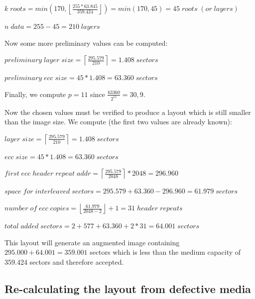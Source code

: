 \smallskip

$k\; roots = min\left(170, \left\lfloor\frac{255* 63.845}{359.424}\right\rfloor\right) = min(170, 45) = 45\; roots\; (or\; layers)$

\smallskip

$n\; data = 255 - 45 = 210\; layers$

\bigskip

Now some more preliminary values can be computed:

\smallskip

$preliminary\; layer\; size = \left\lceil\frac{295.579}{210}\right\rceil = 1.408\; sectors$

\smallskip

$preliminary\; ecc\; size = 45 * 1.408 = 63.360\; sectors$

\bigskip

Finally, we compute $p = 11$ since $\frac{63360}{2^{11}} = 30,9$.

\bigskip

Now the chosen values must be verified to produce a layout which is
still smaller than the image size. We compute (the first two values are already known):

\medskip

$layer\; size = \left\lceil\frac{295.579}{210}\right\rceil = 1.408\; sectors$

\smallskip

$ecc\; size = 45 * 1.408 = 63.360\; sectors$

\smallskip

$first\; ecc\; header\; repeat\; addr = \left\lceil\frac{295.579}{2048}\right\rceil * 2048 = 296.960$

\smallskip 

$space\; for\; interleaved\; sectors = 295.579 + 63.360 - 296.960 = 61.979\; sectors$

\smallskip

$number\; of\; ecc\; copies = \left\lfloor\frac{61.979}{2048-2}\right\rfloor + 1 = 31\; header\; repeats$

\smallskip

$total\; added\; sectors = 2 + 577 + 63.360 + 2 * 31 = 64.001\; sectors$

\medskip

This layout will generate an augmented image containing
$295.000 + 64.001 = 359.001$ sectors which is 
less than the medium capacity of 359.424 sectors
and therefore accepted.

\subsection{Re-calculating the layout from defective media}
\label{search-two}

